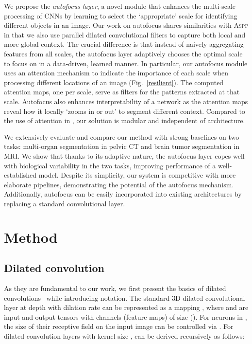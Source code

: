 \documentclass{llncs}
\begin{document}
We propose the \textit{autofocus layer}, a novel module that enhances the multi-scale processing of CNNs by learning to select the `appropriate' scale for identifying different objects in an image.
Our work on autofocus shares similarities with \textsc{Aspp} in that we also use parallel dilated convolutional filters to capture both local and more global context.
The crucial difference is that instead of naively aggregating features from all scales, the autofocus layer adaptively chooses the optimal scale to focus on in a data-driven, learned manner. 
In particular, our autofocus module uses an attention mechanism \cite{bahdanau2014neural} to indicate the importance of each scale when processing different locations of an image (Fig.~\ref{resilient}). The computed attention maps, one per scale, serve as filters for the patterns extracted at that scale. Autofocus also enhances interpretability of a network as the attention maps reveal how it locally `zooms in or out' to segment different context. Compared to the use of attention in \cite{chen2016attention}, our solution is modular and independent of architecture.


We extensively evaluate and compare our method with strong baselines on two tasks: multi-organ segmentation in pelvic CT and brain tumor segmentation in MRI. We show that thanks to its adaptive nature, the autofocus layer copes well with biological variability in the two tasks, improving performance of a well-established model. Despite its simplicity, our system is competitive with more elaborate pipelines, demonstrating the potential of the autofocus mechanism. Additionally, autofocus can be easily incorporated into existing architectures by replacing a standard convolutional layer.

\vspace{-3mm}
\section{Method}
\vspace{-2mm}
\subsection{Dilated convolution}
As they are fundamental to our work, we first present the basics of dilated convolutions~\cite{chen2016deeplab,yu2015multi} while introducing notation.
The standard 3D dilated convolutional layer at depth  with dilation rate  can be represented as a mapping , 
where  and  are input and output tensors with  channels (feature maps) of size (). For neurons in  , the size  of their receptive field on the input image can be controlled via . 
For dilated convolution layers with kernel size ,  can be derived recursively as follows:
\vspace{-2mm}
\end{document}

